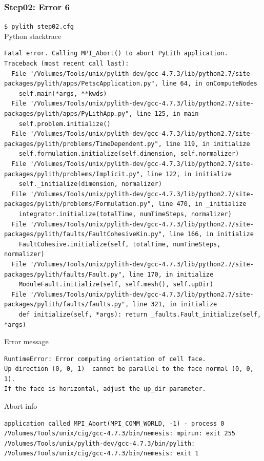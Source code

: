 \documentclass{beamer}
\newcommand{\cmd}[1]{{\tiny\tt \color{ltred}#1}}
\newcommand{\errlabel}[1]{{\small \color{blue}#1}}
\begin{document}
\begin{frame}[fragile]
  \frametitle{Step02: Error 6}

\cmd{\$ pylith step02.cfg}\\
\errlabel{Python stacktrace}
\begin{lstlisting}
Fatal error. Calling MPI_Abort() to abort PyLith application.
Traceback (most recent call last):
  File "/Volumes/Tools/unix/pylith-dev/gcc-4.7.3/lib/python2.7/site-packages/pylith/apps/PetscApplication.py", line 64, in onComputeNodes
    self.main(*args, **kwds)
  File "/Volumes/Tools/unix/pylith-dev/gcc-4.7.3/lib/python2.7/site-packages/pylith/apps/PyLithApp.py", line 125, in main
    self.problem.initialize()
  File "/Volumes/Tools/unix/pylith-dev/gcc-4.7.3/lib/python2.7/site-packages/pylith/problems/TimeDependent.py", line 119, in initialize
    self.formulation.initialize(self.dimension, self.normalizer)
  File "/Volumes/Tools/unix/pylith-dev/gcc-4.7.3/lib/python2.7/site-packages/pylith/problems/Implicit.py", line 122, in initialize
    self._initialize(dimension, normalizer)
  File "/Volumes/Tools/unix/pylith-dev/gcc-4.7.3/lib/python2.7/site-packages/pylith/problems/Formulation.py", line 470, in _initialize
    integrator.initialize(totalTime, numTimeSteps, normalizer)
  File "/Volumes/Tools/unix/pylith-dev/gcc-4.7.3/lib/python2.7/site-packages/pylith/faults/FaultCohesiveKin.py", line 166, in initialize
    FaultCohesive.initialize(self, totalTime, numTimeSteps, normalizer)
  File "/Volumes/Tools/unix/pylith-dev/gcc-4.7.3/lib/python2.7/site-packages/pylith/faults/Fault.py", line 170, in initialize
    ModuleFault.initialize(self, self.mesh(), self.upDir)
  File "/Volumes/Tools/unix/pylith-dev/gcc-4.7.3/lib/python2.7/site-packages/pylith/faults/faults.py", line 321, in initialize
    def initialize(self, *args): return _faults.Fault_initialize(self, *args)
\end{lstlisting}
\errlabel{Error message}
\begin{lstlisting}
RuntimeError: Error computing orientation of cell face.
Up direction (0, 0, 1)  cannot be parallel to the face normal (0, 0, 1).
If the face is horizontal, adjust the up_dir parameter.
\end{lstlisting}
\errlabel{Abort info}
\begin{lstlisting}
application called MPI_Abort(MPI_COMM_WORLD, -1) - process 0
/Volumes/Tools/unix/cig/gcc-4.7.3/bin/nemesis: mpirun: exit 255
/Volumes/Tools/unix/pylith-dev/gcc-4.7.3/bin/pylith: /Volumes/Tools/unix/cig/gcc-4.7.3/bin/nemesis: exit 1
\end{lstlisting}

\end{frame}
\end{document}
